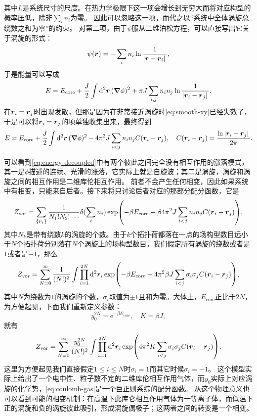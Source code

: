 \documentclass[hyperref, UTF8, a4paper]{ctexart}
\newcommand*{\ee}{\mathrm{e}}
\begin{document}
其中$L$是系统尺寸的尺度。在热力学极限下这一项会增长到无穷大而将对应构型的概率压低，除非$\sum_i n_i$为零。
因此可以忽略这一项，而代之以“系统中全体涡旋总绕数之和为零”的约束。
对第二项，由于$\psi$服从二维泊松方程，可以直接写出它关于涡旋的形式：
\begin{equation}
    \psi(\vb*{r}) = - \sum_i n_i \ln \frac{1}{\abs*{\vb*{r} - \vb*{r}_i}} ,
\end{equation}
于是能量可以写成
\[
    E = E_\text{core} + \frac{J}{2} \int \dd[2]{\vb*{r}} (\grad{\phi})^2 + \pi J \sum_{i, j} n_i n_j \ln \frac{1}{\abs*{\vb*{r}_i - \vb*{r}_j}}.
\]
在$\vb*{r}_i = \vb*{r}_j$时出现发散，但那是因为在非常接近涡旋时\eqref{eq:smooth-xy}已经失效了，于是可以将$\vb*{r}_i = \vb*{r}_j$的项单独收集出来，最终得到
\begin{equation}
    E = E_\text{core} + \frac{J}{2} \int \dd[2]{\vb*{r}} (\grad{\phi})^2 - 4 \pi^2 J \sum_{i < j} n_i n_j C(\vb*{r}_i - \vb*{r}_j), \quad C(\vb*{r}_i - \vb*{r}_j) = \frac{\ln \abs*{\vb*{r}_i - \vb*{r}_j}}{2\pi}. 
    \label{eq:energy-decoupled}
\end{equation}


可以看到\eqref{eq:energy-decoupled}中有两个彼此之间完全没有相互作用的涨落模式，其一是$\phi$描述的连续、光滑的涨落，它实际上就是自旋波；其二是涡旋，涡旋和涡旋之间的相互作用是二维库伦相互作用。
前者不会产生任何相变，因此如果系统中有相变，只能来自后者。接下来将只讨论后者对应的那部分配分函数，它是
\[
    Z_\text{vor} = \sum_{\{\vb*{r}_i\}} \frac{1}{N_1 ! N_2 ! \cdots} \delta(\sum_i n_i) \exp( - \beta E_\text{core} + \beta 4 \pi^2 J \sum_{i < j} n_i n_j C(\vb*{r}_i - \vb*{r}_j)),
\]
其中$N_k$是带有绕数$k$的涡旋的个数。由于$k$个拓扑荷都落在一点的场构型数目远小于$N$个拓扑荷分别落在$N$个涡旋上的场构型数目，我们假定所有涡旋的绕数或者是$1$或者是$-1$，那么 %
\[
    Z_\text{vor} = \sum_{N=0}^\infty \frac{1}{(N!)^2} \int \prod_{i=1}^{2N} \dd[2]{\vb*{r}_i} \exp( - \beta E_\text{core} + 4 \pi^2 \beta J \sum_{i < j} \sigma_i \sigma_j C(\vb*{r}_i - \vb*{r}_j)),
\]
其中$N$为绕数为$1$的涡旋的个数，$\sigma_i$取值为$\pm 1$且和为零。大体上，$E_\text{core}$正比于$2N$，为方便起见，下面我们重新定义参数：
\[
    y_0^{2N} = \ee^{-\beta E_\text{core}}, \quad K = \beta J,
\]
就有
\begin{equation}
    Z_\text{vor} = \sum_{N=0}^\infty \frac{y_0^{2N}}{(N!)^2} \int \prod_{i=1}^{2N} \dd[2]{\vb*{r}_i} \exp(4 \pi^2 K \sum_{i < j} \sigma_i \sigma_j C(\vb*{r}_i - \vb*{r}_j)),
    \label{eq:coulomb-gas}
\end{equation}
这里为方便起见我们直接假定$1 \leq i \leq N$时$\sigma_i=1$而其它时候$\sigma_i=-1$。
这个模型实际上给出了一个电中性、粒子数不定的二维库伦相互作用气体，而$y_0$实际上对应涡旋的化学势，\eqref{eq:coulomb-gas}是一个巨正则系综的配分函数。
从这个物理意义也可以看到可能的相变机制：在高温下此库仑相互作用气体为一等离子体，而低温下正的涡旋和负的涡旋彼此吸引，形成涡旋偶极子；这两者之间的转变是一个相变。
\end{document}
